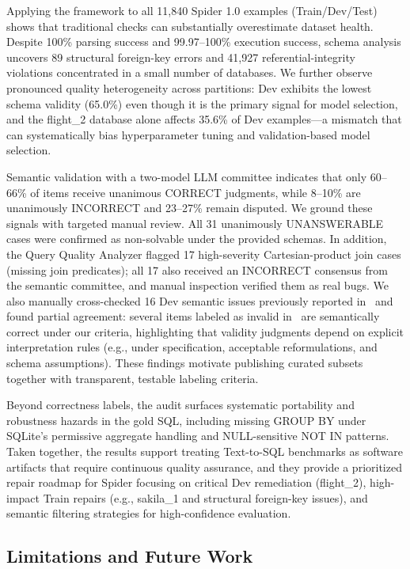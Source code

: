\documentclass[]{einformatica}
\begin{document}
Applying the framework to all 11,840 Spider 1.0 examples (Train/Dev/Test) shows that traditional checks can substantially overestimate dataset health. Despite 100\% parsing success and 99.97--100\% execution success, schema analysis uncovers 89 structural foreign-key errors and 41,927 referential-integrity violations concentrated in a small number of databases. We further observe pronounced quality heterogeneity across partitions: Dev exhibits the lowest schema validity (65.0\%) even though it is the primary signal for model selection, and the flight\_2 database alone affects 35.6\% of Dev examples---a mismatch that can systematically bias hyperparameter tuning and validation-based model selection.

Semantic validation with a two-model LLM committee indicates that only 60--66\% of items receive unanimous CORRECT judgments, while 8--10\% are unanimously INCORRECT and 23--27\% remain disputed. We ground these signals with targeted manual review. All 31 unanimously UNANSWERABLE cases were confirmed as non-solvable under the provided schemas. In addition, the Query Quality Analyzer flagged 17 high-severity Cartesian-product join cases (missing join predicates); all 17 also received an INCORRECT consensus from the semantic committee, and manual inspection verified them as real bugs. We also manually cross-checked 16 Dev semantic issues previously reported in~\cite{liu2025nl2sqlbugs} and found partial agreement: several items labeled as invalid in~\cite{liu2025nl2sqlbugs} are semantically correct under our criteria, highlighting that validity judgments depend on explicit interpretation rules (e.g., under specification, acceptable reformulations, and schema assumptions). These findings motivate publishing curated subsets together with transparent, testable labeling criteria.

Beyond correctness labels, the audit surfaces systematic portability and robustness hazards in the gold SQL, including missing GROUP BY under SQLite's permissive aggregate handling and NULL-sensitive NOT IN patterns. Taken together, the results support treating Text-to-SQL benchmarks as software artifacts that require continuous quality assurance, and they provide a prioritized repair roadmap for Spider focusing on critical Dev remediation (flight\_2), high-impact Train repairs (e.g., sakila\_1 and structural foreign-key issues), and semantic filtering strategies for high-confidence evaluation.

\subsection{Limitations and Future Work}
\end{document}

